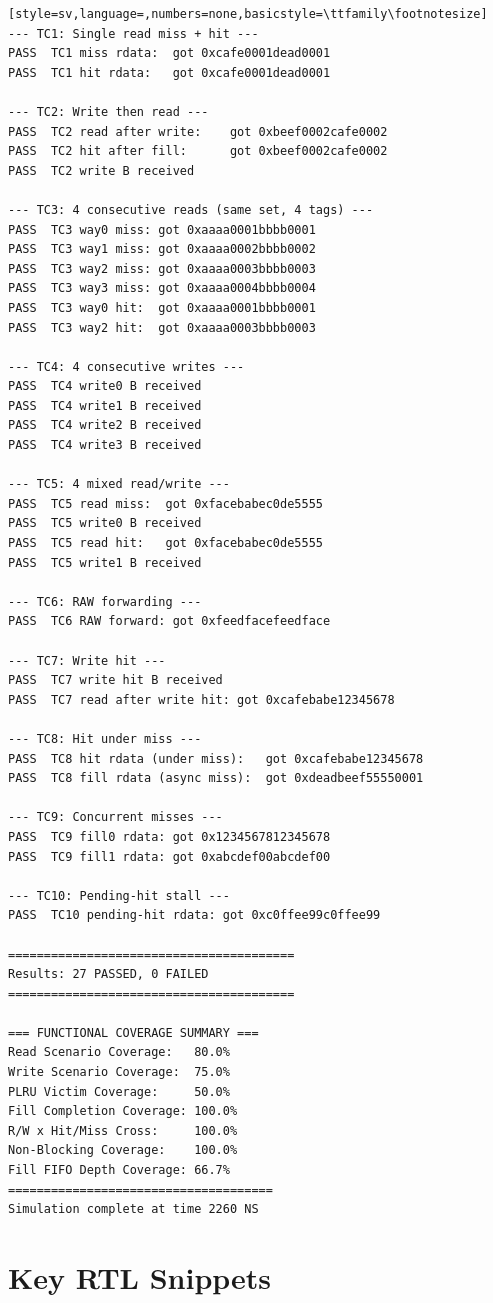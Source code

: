 \documentclass[12pt,letterpaper]{report}
\begin{document}
\begin{lstlisting}[style=sv,language=,numbers=none,basicstyle=\ttfamily\footnotesize]
--- TC1: Single read miss + hit ---
PASS  TC1 miss rdata:  got 0xcafe0001dead0001
PASS  TC1 hit rdata:   got 0xcafe0001dead0001

--- TC2: Write then read ---
PASS  TC2 read after write:    got 0xbeef0002cafe0002
PASS  TC2 hit after fill:      got 0xbeef0002cafe0002
PASS  TC2 write B received

--- TC3: 4 consecutive reads (same set, 4 tags) ---
PASS  TC3 way0 miss: got 0xaaaa0001bbbb0001
PASS  TC3 way1 miss: got 0xaaaa0002bbbb0002
PASS  TC3 way2 miss: got 0xaaaa0003bbbb0003
PASS  TC3 way3 miss: got 0xaaaa0004bbbb0004
PASS  TC3 way0 hit:  got 0xaaaa0001bbbb0001
PASS  TC3 way2 hit:  got 0xaaaa0003bbbb0003

--- TC4: 4 consecutive writes ---
PASS  TC4 write0 B received
PASS  TC4 write1 B received
PASS  TC4 write2 B received
PASS  TC4 write3 B received

--- TC5: 4 mixed read/write ---
PASS  TC5 read miss:  got 0xfacebabec0de5555
PASS  TC5 write0 B received
PASS  TC5 read hit:   got 0xfacebabec0de5555
PASS  TC5 write1 B received

--- TC6: RAW forwarding ---
PASS  TC6 RAW forward: got 0xfeedfacefeedface

--- TC7: Write hit ---
PASS  TC7 write hit B received
PASS  TC7 read after write hit: got 0xcafebabe12345678

--- TC8: Hit under miss ---
PASS  TC8 hit rdata (under miss):   got 0xcafebabe12345678
PASS  TC8 fill rdata (async miss):  got 0xdeadbeef55550001

--- TC9: Concurrent misses ---
PASS  TC9 fill0 rdata: got 0x1234567812345678
PASS  TC9 fill1 rdata: got 0xabcdef00abcdef00

--- TC10: Pending-hit stall ---
PASS  TC10 pending-hit rdata: got 0xc0ffee99c0ffee99

========================================
Results: 27 PASSED, 0 FAILED
========================================

=== FUNCTIONAL COVERAGE SUMMARY ===
Read Scenario Coverage:   80.0%
Write Scenario Coverage:  75.0%
PLRU Victim Coverage:     50.0%
Fill Completion Coverage: 100.0%
R/W x Hit/Miss Cross:     100.0%
Non-Blocking Coverage:    100.0%
Fill FIFO Depth Coverage: 66.7%
=====================================
Simulation complete at time 2260 NS
\end{lstlisting}

\chapter{Key RTL Snippets}
\label{app:rtl}
\end{document}
